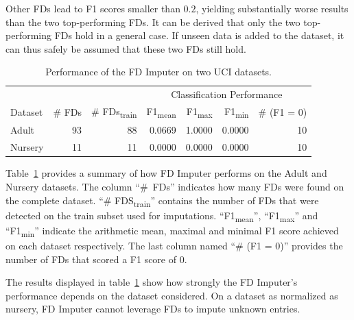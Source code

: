 Other FDs lead to F1 scores smaller than \( 0.2\), yielding substantially worse results than the two top-performing FDs.
It can be derived that only the two top-performing FDs hold in a general case.
If unseen data is added to the dataset, it can thus safely be assumed that these two FDs still hold.

\begin{table}[ht]
    \centering
    \begin{tabular}{lrrrrrr}
        \toprule
        & & & \multicolumn{4}{c}{Classification Performance} \\
        \cmidrule(lr{.25em}){4-7}
        Dataset & \# FDs & \# FDs\textsubscript{train} & F1\textsubscript{mean} & F1\textsubscript{max} & F1\textsubscript{min} & \# (F1 = 0) \\
        \midrule
        Adult & 93 & 88 & 0.0669 & 1.0000 & 0.0000 & 10 \\
        Nursery & 11 & 11 & 0.0000 & 0.0000 & 0.0000 & 10 \\
        \bottomrule
    \end{tabular}
    \caption{Performance of the FD Imputer on two UCI datasets.}\label{tab:fd-imputer-performance}
\end{table}

Table~\ref{tab:fd-imputer-performance} provides a summary of how FD Imputer performs on the Adult and Nursery datasets.
The column ``\#~FDs'' indicates how many FDs were found on the complete dataset.
``\# FDS\textsubscript{train}'' contains the number of FDs that were detected on the train subset used for imputations.
``F1\textsubscript{mean}'', ``F1\textsubscript{max}'' and ``F1\textsubscript{min}'' indicate the arithmetic mean, maximal and minimal F1 score achieved on each dataset respectively.
The last column named ``\# (F1 = 0)'' provides the number of FDs that scored a F1 score of 0.

The results displayed in table~\ref{tab:fd-imputer-performance} show how strongly the FD Imputer's performance depends on the dataset considered.
On a dataset as normalized as nursery, FD Imputer cannot leverage FDs to impute unknown entries.

